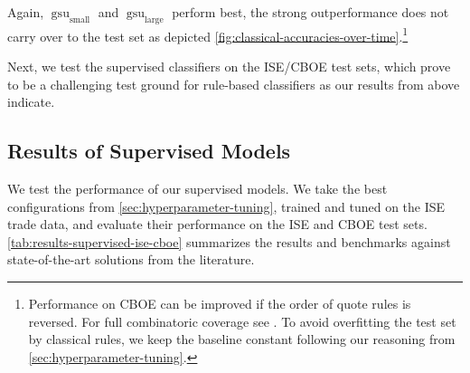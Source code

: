 Again, $\operatorname{gsu}_{\mathrm{small}}$ and $\operatorname{gsu}_{\mathrm{large}}$ perform best, the strong outperformance does not carry over to the test set as depicted \cref{fig:classical-accuracies-over-time}.\footnote{Performance on \gls{CBOE} can be improved if the order of quote rules is reversed. For full combinatoric coverage see \textcite[][33]{grauerOptionTradeClassification2022}. To avoid overfitting the test set by classical rules, we keep the baseline constant following our reasoning from \cref{sec:hyperparameter-tuning}.}

Next, we test the supervised classifiers on the \gls{ISE}/\gls{CBOE} test sets, which prove to be a challenging test ground for rule-based classifiers as our results from above indicate.

\subsection{Results of Supervised
    Models}\label{sec:results-of-supervised-models}

We test the performance of our supervised models. We take the best configurations from \cref{sec:hyperparameter-tuning}, trained and tuned on the \gls{ISE} trade data, and evaluate their performance on the \gls{ISE} and \gls{CBOE} test sets. \cref{tab:results-supervised-ise-cboe} summarizes the results and benchmarks against state-of-the-art solutions from the literature.

